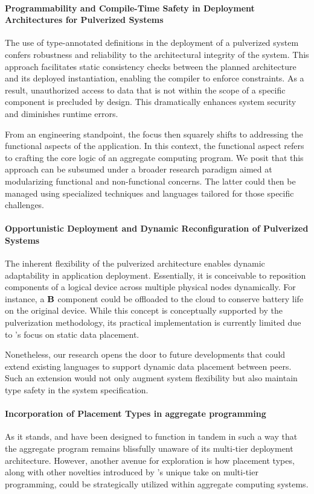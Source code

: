\paragraph*{Programmability and Compile-Time Safety in Deployment Architectures for Pulverized Systems}
The use of type-annotated definitions in the deployment of a pulverized system confers robustness and reliability to the architectural integrity of the system. 
 This approach facilitates static consistency checks between the planned architecture and its deployed instantiation, 
 enabling the compiler to enforce constraints. 
 As a result, unauthorized access to data that is not within the scope of a specific component is precluded by design. 
 This dramatically enhances system security and diminishes runtime errors. 

From an engineering standpoint, 
 the focus then squarely shifts to addressing the functional aspects of the application. 
 In this context, the functional aspect refers to crafting the core logic of an aggregate computing program. 
 We posit that this approach can be subsumed under a broader research paradigm aimed at modularizing functional and non-functional concerns. 
 The latter could then be managed using specialized techniques and languages tailored for those specific challenges.

\paragraph*{Opportunistic Deployment and Dynamic Reconfiguration of Pulverized Systems}
The inherent flexibility of the pulverized architecture enables dynamic adaptability in application deployment. 
 Essentially, it is conceivable to reposition components of a logical device across multiple physical nodes dynamically. 
 For instance, a $\mathbf{B}$ component could be offloaded to the cloud to conserve battery life on the original device. 
 While this concept is conceptually supported by the pulverization methodology, its practical implementation is currently limited due to \scalaloci{}'s focus on static data placement.

Nonetheless, 
 our research opens the door to future developments that could extend existing languages to support dynamic data placement between peers. 
 Such an extension would not only augment system flexibility but also maintain type safety in the system specification.

\paragraph*{Incorporation of Placement Types in aggregate programming}
As it stands, \scalaloci{} and \scafi{} have been designed to function in tandem in such a way that the aggregate program remains blissfully unaware of its multi-tier deployment architecture. 
 However, another avenue for exploration is how placement types, 
 along with other novelties introduced by \scalaloci{}'s unique take on multi-tier programming, 
 could be strategically utilized within aggregate computing systems.

